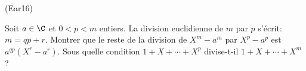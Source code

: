 \begin{tiny}(Ear16)\end{tiny} Soit $a\in \C$ et $0<p < m$ entiers. La division euclidienne de $m$ par $p$ s'écrit: $ m = q p + r$.\newline
Montrer que le reste de la division de $X^m - a^m$ par $X^p - a^p$ est $a^{qp}(X^r - a^r)$. \newline
Sous quelle condition $1+X+\cdots+X^p$ divise-t-il $1+X+\cdots+X^m$ ?
